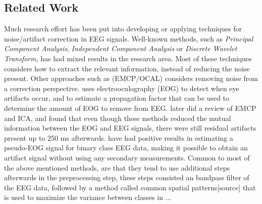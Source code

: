 \subsection{Related Work}
Much research effort has been put into developing or applying techniques for noise/artifact correction in EEG signals. Well-known methods, such as \textit{Principal Component Analysis}, \textit{Independent Component Analysis} or \textit{Discrete Wavelet Transform}, has had mixed results in the research area. Most of these techniques considers how to extract the relevant information, instead of reducing the noise present.
Other approaches such as (EMCP/OCAL) considers removing noise from a correction perspective. \cite{gratton1983new} uses electrooculography (EOG) to detect when eye artifacts occur, and to estimate a propagation factor that can be used to determine the amount of EOG to remove from EEG. \cite{hoffmann2008correction} later did a review of EMCP and ICA, and found that even though these methods reduced the mutual information between the EOG and EEG signals, there were still residual artifacts present up to 250 ms afterwards. \cite{li2015ocular} have had positive results in estimating a pseudo-EOG signal for binary class EEG data, making it possible to obtain an artifact signal without using any secondary measurements. Common to most of the above mentioned methods, are that they tend to use additional steps afterwards in the preprocessing step, these steps consisted an bandpass filter of the EEG data, followed by a method called common spatial patterns[source] that is used to maximize the variance between classes in ...
